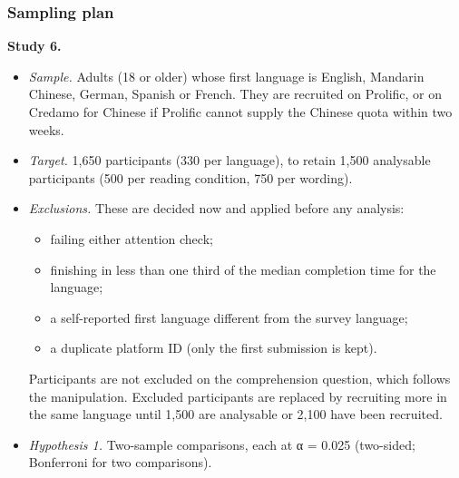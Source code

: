 \documentclass[
  11pt,
]{article}
\providecommand{\tightlist}{%
  \setlength{\itemsep}{0pt}\setlength{\parskip}{0pt}}
\begin{document}
\hypertarget{sampling-plan}{%
\subsubsection{Sampling plan}\label{sampling-plan}}

\textbf{Study 6.}

\begin{itemize}
\tightlist
\item
  \emph{Sample.} Adults (18 or older) whose first language is English,
  Mandarin Chinese, German, Spanish or French. They are recruited on
  Prolific, or on Credamo for Chinese if Prolific cannot supply the
  Chinese quota within two weeks.
\item
  \emph{Target.} 1,650 participants (330 per language), to retain 1,500
  analysable participants (500 per reading condition, 750 per wording).
\item
  \emph{Exclusions.} These are decided now and applied before any
  analysis:

  \begin{itemize}
  \tightlist
  \item
    failing either attention check;
  \item
    finishing in less than one third of the median completion time for
    the language;
  \item
    a self-reported first language different from the survey language;
  \item
    a duplicate platform ID (only the first submission is kept).
  \end{itemize}

  Participants are not excluded on the comprehension question, which
  follows the manipulation. Excluded participants are replaced by
  recruiting more in the same language until 1,500 are analysable or
  2,100 have been recruited.
\item
  \emph{Hypothesis 1.} Two-sample comparisons, each at α = 0.025
  (two-sided; Bonferroni for two comparisons).


\end{itemize}
\end{document}
